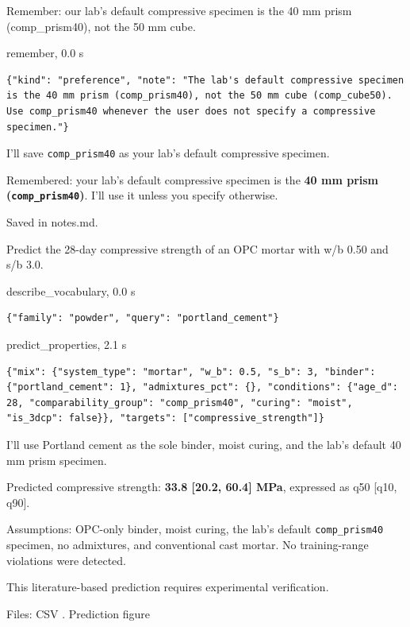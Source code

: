 \begin{userbox}
Remember: our lab's default compressive specimen is the 40 mm prism (comp\_prism40), not the 50 mm cube.
\end{userbox}
\begin{toolbox}{remember, 0.0 s}
\begin{lstlisting}[style=argstyle]
{"kind": "preference", "note": "The lab's default compressive specimen is the 40 mm prism (comp_prism40), not the 50 mm cube (comp_cube50). Use comp_prism40 whenever the user does not specify a compressive specimen."}
\end{lstlisting}
\end{toolbox}
\begin{agentbox}
I'll save \texttt{comp\_prism40} as your lab's default compressive specimen.\par
Remembered: your lab's default compressive specimen is the \textbf{40 mm prism (\texttt{comp\_prism40})}. I'll use it unless you specify otherwise.\par
\par
Saved in notes.md.\par
\par
\end{agentbox}
\begin{userbox}
Predict the 28-day compressive strength of an OPC mortar with w/b 0.50 and s/b 3.0.
\end{userbox}
\begin{toolbox}{describe\_vocabulary, 0.0 s}
\begin{lstlisting}[style=argstyle]
{"family": "powder", "query": "portland_cement"}
\end{lstlisting}
\end{toolbox}
\begin{toolbox}{predict\_properties, 2.1 s}
\begin{lstlisting}[style=argstyle]
{"mix": {"system_type": "mortar", "w_b": 0.5, "s_b": 3, "binder": {"portland_cement": 1}, "admixtures_pct": {}, "conditions": {"age_d": 28, "comparability_group": "comp_prism40", "curing": "moist", "is_3dcp": false}}, "targets": ["compressive_strength"]}
\end{lstlisting}
\end{toolbox}
\begin{agentbox}
I'll use Portland cement as the sole binder, moist curing, and the lab's default 40 mm prism specimen.\par
\par
Predicted compressive strength: \textbf{33.8 [20.2, 60.4] MPa}, expressed as q50 [q10, q90].\par
\par
Assumptions: OPC-only binder, moist curing, the lab's default \texttt{comp\_prism40} specimen, no admixtures, and conventional cast mortar. No training-range violations were detected.\par
\par
This literature-based prediction requires experimental verification.\par
\par
Files: CSV . Prediction figure\par
\par
\end{agentbox}